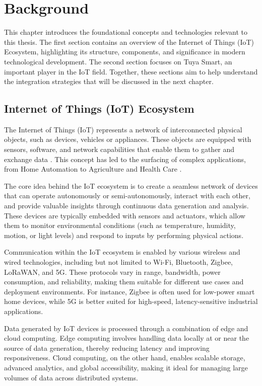 
\chapter{Background}

This chapter introduces the foundational concepts and technologies relevant to this thesis. The first section contains an overview of the Internet of Things (IoT) Ecosystem, highlighting its structure, components, and significance in modern technological development. The second section focuses on Tuya Smart, an important player in the IoT field. Together, these sections aim to help understand the integration strategies that will be discussed in the next chapter.

\section{Internet of Things (IoT) Ecosystem}

The Internet of Things (IoT) represents a network of interconnected physical objects, such as devices, vehicles or appliances. These objects are equipped with sensors, software, and network capabilities that enable them to gather and exchange data \cite{ibmWhatInternet}. This concept has led to the surfacing of complex applications, from Home Automation to Agriculture and Health Care \cite{porkodiInternetThings14}.

The core idea behind the IoT ecosystem is to create a seamless network of devices that can operate autonomously or semi-autonomously, interact with each other, and provide valuable insights through continuous data generation and analysis. These devices are typically embedded with sensors and actuators, which allow them to monitor environmental conditions (such as temperature, humidity, motion, or light levels) and respond to inputs by performing physical actions.

Communication within the IoT ecosystem is enabled by various wireless and wired technologies, including but not limited to Wi-Fi, Bluetooth, Zigbee, LoRaWAN, and 5G. These protocols vary in range, bandwidth, power consumption, and reliability, making them suitable for different use cases and deployment environments. For instance, Zigbee is often used for low-power smart home devices, while 5G is better suited for high-speed, latency-sensitive industrial applications.

Data generated by IoT devices is processed through a combination of edge and cloud computing. Edge computing involves handling data locally at or near the source of data generation, thereby reducing latency and improving responsiveness. Cloud computing, on the other hand, enables scalable storage, advanced analytics, and global accessibility, making it ideal for managing large volumes of data across distributed systems.

